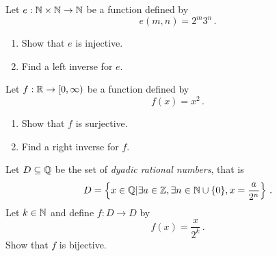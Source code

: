 \documentclass[12pt]{amsart}
\begin{document}
\begin{problem}
    Let $e:\mathbb{N} \times \mathbb{N} \to \mathbb{N}$ be a function defined by
    \begin{equation*}
        e(m,n) = 2^m 3^n \,.
    \end{equation*}
    \begin{enumerate}
        \item Show that $e$ is injective.
        \item Find a left inverse for $e$.
    \end{enumerate}
\end{problem}

\begin{problem}
    Let $f:\mathbb{R} \to [0,\infty)$ be a function defined by 
    \begin{equation*}
        f(x) = x^2 \,.
    \end{equation*}
    \begin{enumerate}
        \item Show that $f$ is surjective.
        \item Find a right inverse for $f$.
    \end{enumerate}
\end{problem}

\begin{problem}
    Let $D \subseteq \mathbb{Q}$ be the set of \emph{dyadic rational numbers}, that is
    \begin{equation*}
        D =\left\{x \in \mathbb{Q} \vert \exists a \in \mathbb{Z}, \exists n\in \mathbb{N} \cup \{ 0 \}, x = \frac{a}{2^n} \right\} \,.
    \end{equation*}
    Let $k \in \mathbb{N}$ and define $f:D\to D$ by
    \begin{equation*}
        f(x) = \frac{x}{2^k} \,.
    \end{equation*}
    Show that $f$ is bijective.
\end{problem}
\end{document}
